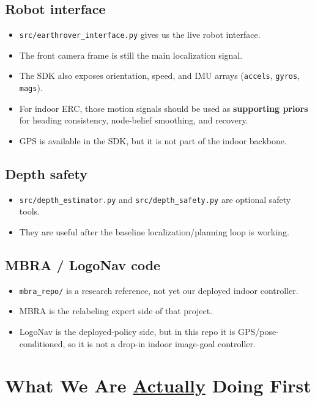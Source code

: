 \documentclass[11pt,a4paper]{article}
\begin{document}
\subsection*{Robot interface}

\begin{itemize}[nosep]
  \item \texttt{src/earthrover\_interface.py} gives us the live robot interface.
  \item The front camera frame is still the main localization signal.
  \item The SDK also exposes orientation, speed, and IMU arrays (\texttt{accels}, \texttt{gyros}, \texttt{mags}).
  \item For indoor ERC, those motion signals should be used as \textbf{supporting priors} for heading consistency, node-belief smoothing, and recovery.
  \item GPS is available in the SDK, but it is not part of the indoor backbone.
\end{itemize}

\subsection*{Depth safety}

\begin{itemize}[nosep]
  \item \texttt{src/depth\_estimator.py} and \texttt{src/depth\_safety.py} are optional safety tools.
  \item They are useful after the baseline localization/planning loop is working.
\end{itemize}

\subsection*{MBRA / LogoNav code}

\begin{itemize}[nosep]
  \item \texttt{mbra\_repo/} is a research reference, not yet our deployed indoor controller.
  \item MBRA is the relabeling expert side of that project.
  \item LogoNav is the deployed-policy side, but in this repo it is GPS/pose-conditioned, so it is not a drop-in indoor image-goal controller.
\end{itemize}


\section{What We Are \underline{Actually} Doing First}
\end{document}
